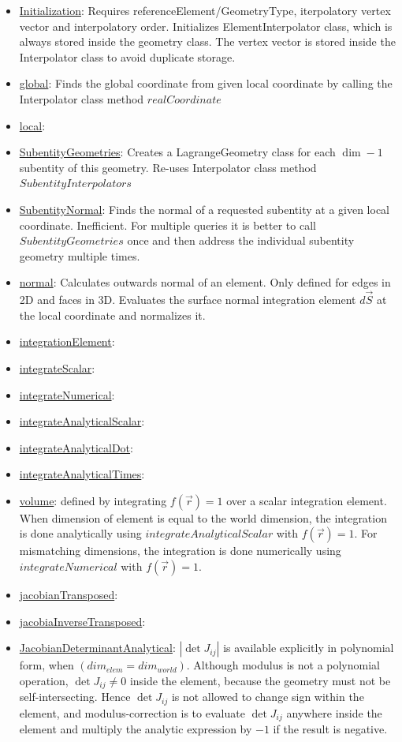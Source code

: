 \documentclass[12pt]{article}
\begin{document}
\begin{itemize}
\item \uline{Initialization}: Requires referenceElement/GeometryType, iterpolatory vertex vector and interpolatory order. Initializes ElementInterpolator class, which is always stored inside the geometry class. The vertex vector is stored inside the Interpolator class to avoid duplicate storage. \\
\item \uline{global}: Finds the global coordinate from given local coordinate by calling the Interpolator class method $realCoordinate$
\item \uline{local}:
\item \uline{SubentityGeometries}: Creates a LagrangeGeometry class for each $\dim-1$ subentity of this geometry. Re-uses Interpolator class method $SubentityInterpolators$
\item \uline{SubentityNormal}: Finds the normal of a requested subentity at a given local coordinate. Inefficient. For multiple queries it is better to call $SubentityGeometries$ once and then address the individual subentity geometry multiple times.
\item \uline{normal}: Calculates outwards normal of an element. Only defined for edges in 2D and faces in 3D. Evaluates the surface normal integration element $d\vec{S}$ at the local coordinate and normalizes it.
\item \uline{integrationElement}:
\item \uline{integrateScalar}:
\item \uline{integrateNumerical}:
\item \uline{integrateAnalyticalScalar}:
\item \uline{integrateAnalyticalDot}:
\item \uline{integrateAnalyticalTimes}:
\item \uline{volume}: defined by integrating $f(\vec{r}) = 1$ over a scalar integration element. When dimension of element is equal to the world dimension, the integration is done analytically using $integrateAnalyticalScalar$ with $f(\vec{r}) = 1$. For mismatching dimensions, the integration is done numerically using $integrateNumerical$ with $f(\vec{r}) = 1$. 
\item \uline{jacobianTransposed}:
\item \uline{jacobiaInverseTransposed}:
\item \uline{JacobianDeterminantAnalytical}: $|\det J_{ij}|$ is available explicitly in polynomial form, when $(dim_{elem} = dim_{world})$. Although modulus is not a polynomial operation, $\det J_{ij} \neq 0$ inside the element, because the geometry must not be self-intersecting. Hence $\det J_{ij}$ is not allowed to change sign within the element, and modulus-correction is to evaluate $\det J_{ij}$ anywhere inside the element and multiply the analytic expression by $-1$ if the result is negative.

\end{itemize}
\end{document}
